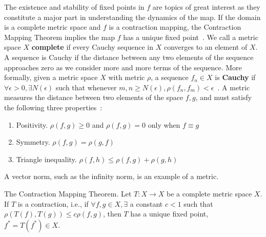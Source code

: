 The existence and stability of fixed points in $f$ are topics of great
interest as they constitute a major part in understanding the
dynamics of the map. If the domain is a complete metric space and $f$ is a contraction
mapping, the Contraction Mapping Theorem implies the map $f$ has a unique
fixed point~\cite{meiss}. We call a metric space $X$ \textbf{complete} if every
Cauchy sequence in $X$ converges to an element of $X$. A sequence is
Cauchy if the distance between any two elements of the sequence
approaches zero as we consider more and more terms of the
sequence. More formally, given a metric space $X$ with metric $\rho$, a sequence $f_n \in X$ is \textbf{Cauchy} if
$\forall \epsilon>0, \exists N(\epsilon)$ such that whenever $m,n \geq
N(\epsilon), \rho(f_n,f_m)<\epsilon$~\cite{meiss}. A metric measures
the distance between two elements of the space $f,g$, and must satisfy the following three
properties~\cite{meiss}:
\begin{enumerate}
\item Positivity. $\rho(f,g) \geq 0$ and $\rho(f,g)=0$ only when $f
  \equiv g$
\item Symmetry. $\rho(f,g) = \rho(g,f)$
\item Triangle inequality. $\rho(f,h) \leq \rho(f,g) + \rho(g,h)$
\end{enumerate}
A vector norm, such as the infinity norm, is an example of a metric. 
\begin{singlespace}
\begin{theorem}\label{thm:contraction}
The Contraction Mapping Theorem. Let $T:X\to X$ be a complete metric space $X$. If $T$ is a
contraction, i.e., if $\forall f,g \in X, \exists$ a constant $c<1$
such that $\rho(T(f),T(g)) \leq c\rho(f,g)$, then $T$ has a unique
fixed point, $f^* = T(f^*) \in X$.
\end{theorem}
\end{singlespace}

